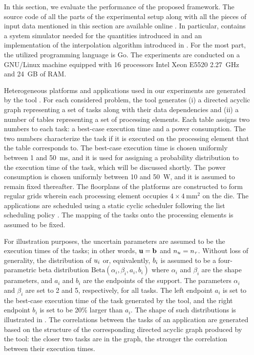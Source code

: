In this section, we evaluate the performance of the proposed framework. The
source code of all the parts of the experimental setup along with all the pieces
of input data mentioned in this section are available online \cite{sources}. In
particular, \cite{sources} contains a system simulator needed for the quantities
introduced in  and an implementation of the interpolation
algorithm introduced in . For the most part, the utilized
programming language is Go. The experiments are conducted on a GNU/Linux machine
equipped with 16 processors Intel Xeon E5520 2.27~GHz and 24~GB of RAM.

Heterogeneous platforms and applications used in our experiments are generated
by the  tool \cite{dick1998}. For each considered problem, the tool
generates (i) a directed acyclic graph representing a set of tasks along with
their data dependencies and (ii) a number of tables representing a set of
processing elements. Each table assigns two numbers to each task: a best-case
execution time and a power consumption. The two numbers characterize the task if
it is executed on the processing element that the table corresponds to. The
best-case execution time is chosen uniformly between 1 and 50~ms, and it is used
for assigning a probability distribution to the execution time of the task,
which will be discussed shortly. The power consumption is chosen uniformly
between 10 and 50~W, and it is assumed to remain fixed thereafter. The
floorplans of the platforms are constructed to form regular grids wherein each
processing element occupies $4 \times 4~\text{mm}^2$ on the die. The
applications are scheduled using a static cyclic scheduler following the list
scheduling policy \cite{adam1974}. The mapping of the tasks onto the processing
elements is assumed to be fixed.


For illustration purposes, the uncertain parameters are assumed to be the
execution times of the tasks; in other words, $\mathbf{u} = \mathbf{b}$ and ${n_u} = {n_\tau}$.
Without loss of generality, the distribution of $u_i$ or, equivalently, $b_i$
is assumed to be a four-parametric beta distribution $\text{Beta}(\alpha_i,
\beta_i, a_i, b_i)$ where $\alpha_i$ and $\beta_i$ are the shape parameters, and
$a_i$ and $b_i$ are the endpoints of the support. The parameters $\alpha_i$ and
$\beta_i$ are set to 2 and 5, respectively, for all tasks. The left endpoint
$a_i$ is set to the best-case execution time of the task generated by the
 tool, and the right endpoint $b_i$ is set to be 20\% larger than
$a_i$. The shape of such distributions is illustrated in . The
correlations between the tasks of an application are generated based on the
structure of the corresponding directed acyclic graph produced by the
 tool: the closer two tasks are in the graph, the stronger the
correlation between their execution times.

